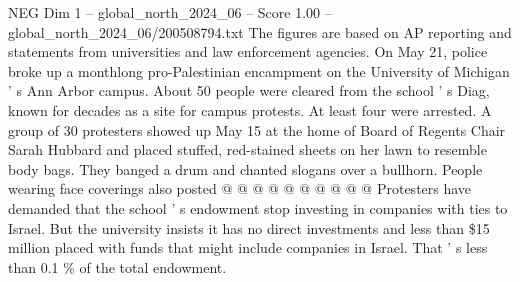 \begin{textsample}{NEG Dim 1 – global\_north\_2024\_06 – Score 1.00 – global\_north\_2024\_06/200508794.txt}
The figures are based on AP reporting and statements from universities and law enforcement agencies.
On May 21, police broke up a monthlong pro-Palestinian encampment on the University of Michigan ' s Ann Arbor campus.
About 50 people were cleared from the school ' s Diag, known for decades as a site for campus protests.
At least four were arrested.
A group of 30 protesters showed up May 15 at the home of Board of Regents Chair Sarah Hubbard and placed stuffed, red-stained sheets on her lawn to resemble body bags.
They banged a drum and chanted slogans over a bullhorn.
People wearing face coverings also posted @ @ @ @ @ @ @ @ @ @ Protesters have demanded that the school ' s endowment stop investing in companies with ties to Israel.
But the university insists it has no direct investments and less than \$15 million placed with funds that might include companies in Israel.
That ' s less than 0.1 \% of the total endowment.

\end{textsample}
